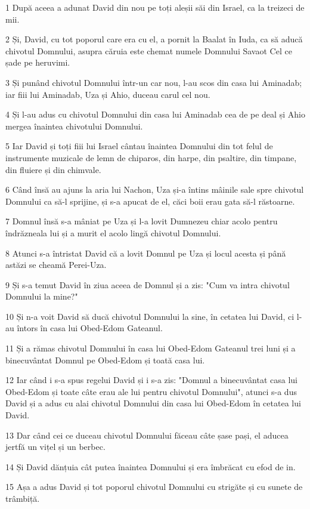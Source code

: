 \par 1 După aceea a adunat David din nou pe toți aleșii săi din Israel, ca la treizeci de mii.
\par 2 Și, David, cu tot poporul care era cu el, a pornit la Baalat în Iuda, ca să aducă chivotul Domnului, asupra căruia este chemat numele Domnului Savaot Cel ce șade pe heruvimi.
\par 3 Și punând chivotul Domnului într-un car nou, l-au scos din casa lui Aminadab; iar fiii lui Aminadab, Uza și Ahio, duceau carul cel nou.
\par 4 Și l-au adus cu chivotul Domnului din casa lui Aminadab cea de pe deal și Ahio mergea înaintea chivotului Domnului.
\par 5 Iar David și toți fiii lui Israel cântau înaintea Domnului din tot felul de instrumente muzicale de lemn de chiparos, din harpe, din psaltire, din timpane, din fluiere și din chimvale.
\par 6 Când însă au ajuns la aria lui Nachon, Uza și-a întins mâinile sale spre chivotul Domnului ca să-l sprijine, și s-a apucat de el, căci boii erau gata să-l răstoarne.
\par 7 Domnul însă s-a mâniat pe Uza și l-a lovit Dumnezeu chiar acolo pentru îndrăzneala lui și a murit el acolo lingă chivotul Domnului.
\par 8 Atunci s-a întristat David că a lovit Domnul pe Uza și locul acesta și până astăzi se cheamă Perei-Uza.
\par 9 Și s-a temut David în ziua aceea de Domnul și a zis: "Cum va intra chivotul Domnului la mine?"
\par 10 Și n-a voit David să ducă chivotul Domnului la sine, în cetatea lui David, ci l-au întors în casa lui Obed-Edom Gateanul.
\par 11 Și a rămas chivotul Domnului în casa lui Obed-Edom Gateanul trei luni și a binecuvântat Domnul pe Obed-Edom și toată casa lui.
\par 12 Iar când i s-a spus regelui David și i s-a zis: "Domnul a binecuvântat casa lui Obed-Edom și toate câte erau ale lui pentru chivotul Domnului", atunci s-a dus David și a adus cu alai chivotul Domnului din casa lui Obed-Edom în cetatea lui David.
\par 13 Dar când cei ce duceau chivotul Domnului făceau câte șase pași, el aducea jertfă un vițel și un berbec.
\par 14 Și David dănțuia cât putea înaintea Domnului și era îmbrăcat cu efod de in.
\par 15 Așa a adus David și tot poporul chivotul Domnului cu strigăte și cu sunete de trâmbiță.
